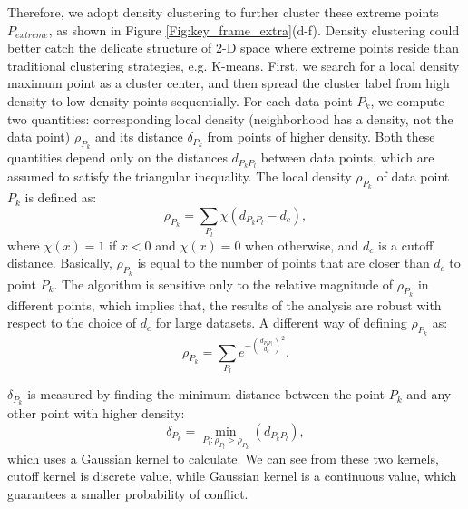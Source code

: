 \documentclass[5p]{elsarticle}
\begin{document}
Therefore, we adopt density clustering  \cite{rodriguez2014clustering}  to further cluster these extreme points $P_\mathit{extreme}$, as shown in Figure \ref{Fig:key_frame_extra}(d-f).
Density clustering could better catch the delicate structure of 2-D space where extreme points reside than traditional clustering strategies, e.g. K-means.
First, we search for a local density maximum point as a cluster center, and then spread the cluster label from high density to low-density points sequentially.
For each data point $P_k$, we compute two quantities: corresponding local density (neighborhood has a density, not the data point) $\rho_\mathit{P_k}$ and its distance $\delta_\mathit{P_k}$ from points of higher density.
Both these quantities depend only on the distances $d_\mathit{{P_k}{P_l}}$ between data points, which are assumed to satisfy the triangular inequality.
The local density $\rho_\mathit{P_k}$ of data point $P_k$ is defined as:
\begin{equation}
\label{Equ:cluster1}
\rho_\mathit{P_k} = \sum_\mathit{P_l} \chi(d_\mathit{{P_k}{P_l}} - d_c),
\end{equation}
where $\chi(x) = 1$ if $x < 0$ and $\chi(x)=0$ when otherwise, and $d_c$ is a cutoff distance.
Basically, $\rho_\mathit{P_k}$ is equal to the number of points that are closer than $d_c$ to point $P_k$.
The algorithm is sensitive only to the relative magnitude of $\rho_\mathit{P_k}$ in different points, which implies that, the results of the analysis are robust with respect to the choice of $d_c$ for large datasets.
A different way of defining $\rho_\mathit{P_k}$ as:
\begin{equation}
\label{Equ:cluster1_2}
\rho_\mathit{P_k} = \sum_\mathit{P_l} e^{-(\frac{d_\mathit{{P_k}{P_l}}}{d_c})^2}.
\end{equation}

$\delta_\mathit{P_k}$ is measured by finding the minimum distance between the point $P_k$ and any other point with higher density:
\begin{equation}
\label{Equ:cluster2}
\delta_\mathit{P_k} = \mathop{min}_\mathit{P_l: \rho_\mathit{P_l} >\rho_\mathit{P_k}}(d_\mathit{{P_k}{P_l}}),
\end{equation}
which uses a Gaussian kernel to calculate.
We can see from these two kernels, cutoff kernel is discrete value, while Gaussian kernel is a continuous value, which guarantees a smaller probability of conflict.
\end{document}
